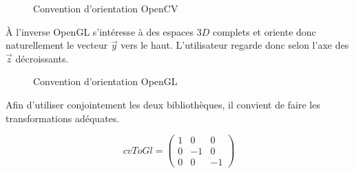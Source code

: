 \documentclass[10pt,a4paper,twoside, twocolumn]{report}
\newcommand*{\rootPath}{../}
\begin{document}
\begin{figure}[!ht]
	\centering
	
	\caption{Convention d'orientation OpenCV}
	\label{fig:tikz:space-opencv}
\end{figure}

À l'inverse OpenGL s’intéresse à des espaces $3D$ complets et oriente donc naturellement le vecteur $\vec y$ vers le haut. L'utilisateur regarde donc selon l'axe des $\vec z$ décroissants.

\begin{figure}[!ht]
	\centering
	
	\caption{Convention d'orientation OpenGL}
	\label{fig:tikz:space-opengl}
\end{figure}

Afin d'utiliser conjointement les deux bibliothèques, il convient de faire les transformations adéquates.

\begin{equation}
	cvToGl = \begin{pmatrix}1 & 0 & 0 \\ 0 & -1 & 0 \\ 0 & 0 & -1\end{pmatrix}
\end{equation}

\ifstandalone
	
	
\fi
\end{document}
